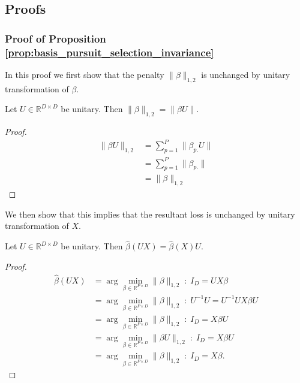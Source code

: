 \subsection{Proofs}
\label{sec:proofs}

\subsubsection{Proof of Proposition \ref{prop:basis_pursuit_selection_invariance}}
\label{proof:basis_pursuit_program_invariance}

In this proof we first show that the penalty $\|\beta\|_{1,2}$ is unchanged by unitary transformation of $\beta$.

 \begin{proposition}
 \label{prop:basis_pursuit_loss_equivalence}
 Let $U \in \mathbb R^{D \times D}$ be unitary.
 Then $\|\beta\|_{1,2} = \|\beta U \|$.
\end{proposition}

\begin{proof}
\begin{align}
\|\beta U \|_{1,2} &= \sum_{p = 1}^P \| \beta_{p.} U \| \\
&= \sum_{p = 1}^P \| \beta_{p.} \| \\
&= \|\beta \|_{1,2}
\end{align}
\end{proof}

We then show that this implies that the resultant loss is unchanged by unitary transformation of $ X$.

\begin{proposition}
 \label{prop:basis_pursuit_loss_equivalence}
 Let $U \in \mathbb R^{D \times D}$ be unitary.
 Then $\widehat \beta  (U  X) = \widehat \beta  (  X) U$.
\end{proposition}

\begin{proof}
\begin{align}
\widehat \beta  (U  X)  &= \arg \min_{\beta \in \mathbb R^{P \times D}} \|\beta\|_{1,2}  \; : \; I_{D} = U X \beta \\
&= \arg \min_{\beta \in \mathbb R^{P \times D}} \|\beta\|_{1,2}  \; : \; U^{-1} U = U^{-1} U X \beta U \\
&= \arg \min_{\beta \in \mathbb R^{P \times D}} \|\beta\|_{1,2}  \; : \;  I_D = X \beta U \\
&= \arg \min_{\beta \in \mathbb R^{P \times D}} \|\beta U \|_{1,2}  \; : \;  I_D = X \beta U \\
&= \arg \min_{\beta \in \mathbb R^{P \times D}} \|\beta \|_{1,2}  \; : \;  I_D = X \beta.
\end{align}
\end{proof}


